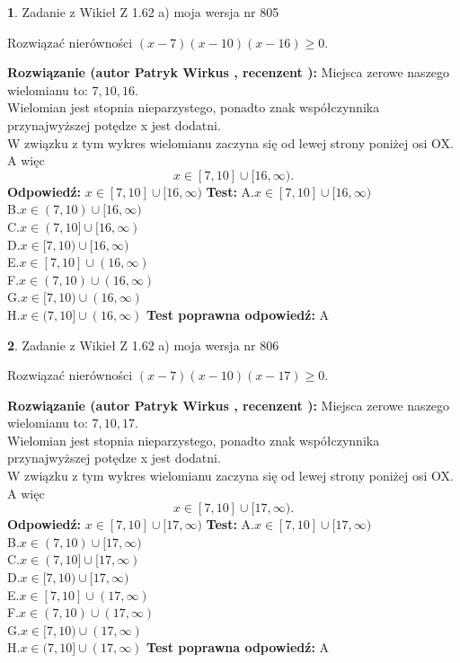 \documentclass[12pt, a4paper]{article}
\theoremstyle{definition} %
\newtheorem{zad}{}
\newcommand{\zadStart}[1]{\begin{zad}#1\newline}
\newcommand{\zadStop}{\end{zad}}
\newcommand{\rozwStart}[2]{\noindent \textbf{Rozwiązanie (autor #1 , recenzent #2): }\newline}
\newcommand{\rozwStop}{\newline}
\newcommand{\odpStart}{\noindent \textbf{Odpowiedź:}\newline}
\newcommand{\odpStop}{\newline}
\newcommand{\testStart}{\noindent \textbf{Test:}\newline}
\newcommand{\testStop}{\newline}
\newcommand{\kluczStart}{\noindent \textbf{Test poprawna odpowiedź:}\newline}
\newcommand{\kluczStop}{\newline}
\begin{document}
\zadStart{Zadanie z Wikieł Z 1.62 a) moja wersja nr 805}

Rozwiązać nierówności $(x-7)(x-10)(x-16)\ge0$.
\zadStop
\rozwStart{Patryk Wirkus}{}
Miejsca zerowe naszego wielomianu to: $7, 10, 16$.\\
Wielomian jest stopnia nieparzystego, ponadto znak współczynnika przy\linebreak najwyższej potędze x jest dodatni.\\ W związku z tym wykres wielomianu zaczyna się od lewej strony poniżej osi OX. A więc $$x \in [7,10] \cup [16,\infty).$$
\rozwStop
\odpStart
$x \in [7,10] \cup [16,\infty)$
\odpStop
\testStart
A.$x \in [7,10] \cup [16,\infty)$\\
B.$x \in (7,10) \cup [16,\infty)$\\
C.$x \in (7,10] \cup [16,\infty)$\\
D.$x \in [7,10) \cup [16,\infty)$\\
E.$x \in [7,10] \cup (16,\infty)$\\
F.$x \in (7,10) \cup (16,\infty)$\\
G.$x \in [7,10) \cup (16,\infty)$\\
H.$x \in (7,10] \cup (16,\infty)$
\testStop
\kluczStart
A
\kluczStop



\zadStart{Zadanie z Wikieł Z 1.62 a) moja wersja nr 806}

Rozwiązać nierówności $(x-7)(x-10)(x-17)\ge0$.
\zadStop
\rozwStart{Patryk Wirkus}{}
Miejsca zerowe naszego wielomianu to: $7, 10, 17$.\\
Wielomian jest stopnia nieparzystego, ponadto znak współczynnika przy\linebreak najwyższej potędze x jest dodatni.\\ W związku z tym wykres wielomianu zaczyna się od lewej strony poniżej osi OX. A więc $$x \in [7,10] \cup [17,\infty).$$
\rozwStop
\odpStart
$x \in [7,10] \cup [17,\infty)$
\odpStop
\testStart
A.$x \in [7,10] \cup [17,\infty)$\\
B.$x \in (7,10) \cup [17,\infty)$\\
C.$x \in (7,10] \cup [17,\infty)$\\
D.$x \in [7,10) \cup [17,\infty)$\\
E.$x \in [7,10] \cup (17,\infty)$\\
F.$x \in (7,10) \cup (17,\infty)$\\
G.$x \in [7,10) \cup (17,\infty)$\\
H.$x \in (7,10] \cup (17,\infty)$
\testStop
\kluczStart
A
\kluczStop
\end{document}

